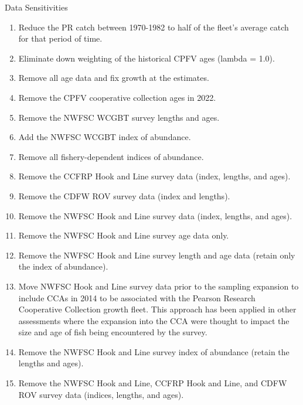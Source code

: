 \documentclass[11pt,
  english,
  letterpaper,
]{article}
\begin{document}
Data Sensitivities

\begin{enumerate}
   
  \item Reduce the PR catch between 1970-1982 to half of the fleet's average catch for that period of time.
  
  \item Eliminate down weighting of the historical CPFV ages (lambda = 1.0).
  
  \item Remove all age data and fix growth at the estimates.
  
  \item Remove the CPFV cooperative collection ages in 2022.
  
  \item Remove the NWFSC WCGBT survey lengths and ages.
  
  \item Add the NWFSC WCGBT index of abundance.
  
  \item Remove all fishery-dependent indices of abundance.
  
  \item Remove the CCFRP Hook and Line survey data (index, lengths, and ages).
  
  \item Remove the CDFW ROV survey data (index and lengths).
  
  \item Remove the NWFSC Hook and Line survey data (index, lengths, and ages).
  
  \item Remove the NWFSC Hook and Line survey age data only.
  
  \item Remove the NWFSC Hook and Line survey length and age data (retain only the index of abundance).
  
  \item Move NWFSC Hook and Line survey data prior to the sampling expansion to include CCAs in 2014 to be associated with the Pearson Research Cooperative Collection growth fleet. This approach has been applied in other assessments where the expansion into the CCA were thought to impact the size and age of fish being encountered by the survey. 
  
  \item Remove the NWFSC Hook and Line survey index of abundance (retain the lengths and ages).
  
  \item Remove the NWFSC Hook and Line, CCFRP Hook and Line, and CDFW ROV survey data (indices, lengths, and ages).

\end{enumerate}
\end{document}
